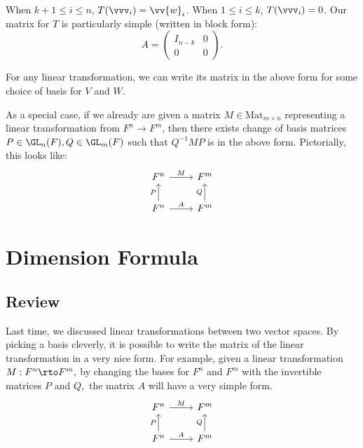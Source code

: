When $k+1 \leq i \leq n$, $T(\vvv_i) = \vv{w}_i$. When $1 \leq i \leq k$, $T(\vvv_i) = 0$.
Our matrix for $T$ is particularly simple (written in block form):
\[A=
\begin{pmatrix}
    I_{n-k} & 0 \\
    0 & 0
\end{pmatrix}.\]
\begin{corollary}
    For any linear transformation, we can write its matrix in the above form for some choice of basis for $V$ and $W$.
\end{corollary}
\begin{corollary}
As a special case, if we already are given a matrix $M \in \text{Mat}_{m\times n}$ representing a linear transformation from $F^n \rightarrow F^m$, then there exists change of basis matrices $P \in \GL_n(F), Q \in \GL_m(F)$ such that $Q^{-1} M P$ is in the above form.
Pictorially, this looks like: 
\[
\begin{tikzcd}
F^n \arrow[r, "M"] & F^m \\
F^n \arrow[u, "P"]\arrow[r, "A"] & F^m \arrow[u, "Q"]
\end{tikzcd}
\]
\end{corollary}


\newpage


\section{Dimension Formula}
\subsection{Review}

Last time, we discussed linear transformations between two vector spaces. By picking a basis cleverly, it is possible to write the matrix of the linear transformation in a very nice form. For example, given a linear transformation $M: F^n \rto F^m,$ by changing the bases for $F^n$ and $F^m$ with the invertible matrices $P$ and $Q,$ the matrix $A$ will have a very simple form. 
\[
\begin{tikzcd}
F^n \arrow[r, "M"] & F^m \\
F^n \arrow[u, "P"]\arrow[r, "A"] & F^m \arrow[u, "Q"]
\end{tikzcd}
\]

